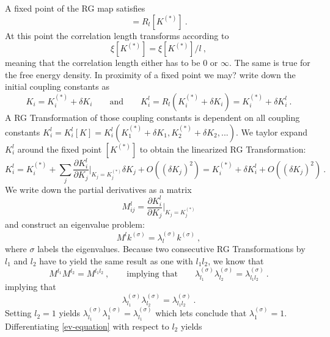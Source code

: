 	A fixed point of the RG	map satisfies
	\begin{equation}
		[K^{(*)}] =	R_l[K^{(*)}] ~.
	\end{equation}
	At this point the correlation length transforms according to
	\begin{equation}
		\xi[K^{(*)}] =	\xi[K^{(*)}] / l~,		
	\end{equation}
	meaning that the correlation length either has to be $0$ or $\infty$. The same is true for the free energy density. In proximity of a fixed point we may? write down the initial coupling constants as
	\begin{equation}
		K_i =	K_i^{(*)} + \delta K_i \qquad \text{and} \qquad K_i^l =	R_l(K_i^{(*)} + \delta K_i) =	K_i^{(*)} + \delta K_i^l~.
	\end{equation}
	A RG Transformation of those coupling constants is dependent on all coupling constants $K^l_i =	K^l_i[K] =	K^l_i(K_1^{(*)} + \delta K_1, K_2^{(*)} + \delta K_2, ...)$. We taylor expand $K_i^l$ around the fixed point $[K^{(*)}]$ to obtain the linearized RG Transformation:
	\begin{equation} \label{linearized-RG}
		K_i^l =	K_i^{(*)} + \sum_j \frac{\partial K_i^l}{\partial K_j} \bigg |_{K_j = K_j^{(*)}} \delta K_j + O((\delta K_j)^2) = K_i^{(*)} + \delta K_i^l + O((\delta K_j)^2) ~.
	\end{equation}
	We write down the partial derivatives as a matrix
	\begin{equation}
		M^l_{ij} =	\frac{\partial K_i^l}{\partial K_j} \bigg |_{K_j = K_j^{(*)}}
	\end{equation}
	and construct an eigenvalue problem:
	\begin{equation} \label{ev-problem}
		M^l k^{(\sigma)} =	\lambda^{(\sigma)}_l k^{(\sigma)}~,
	\end{equation}
	where $\sigma$ labels the eigenvalues. Because two consecutive RG Transformations by $l_1$ and $l_2$ have to yield the same result as one  with $l_1l_2$, we know that 
	\begin{equation}
		M^{l_1}M^{l_2} =	M^{l_1l_2}~, \qquad \text{implying that} \qquad \lambda_{l_1}^{(\sigma)} \lambda_{l_2}^{(\sigma)} =	\lambda_{l_1l_2}^{(\sigma)} ~.
	\end{equation}
	implying that
	\begin{equation}
		\lambda_{l_1}^{(\sigma)} \lambda_{l_2}^{(\sigma)} =	\lambda_{l_1l_2}^{(\sigma)} ~.
		\label{ev-equation}
	\end{equation}
	Setting $l_2 = 1$ yields $\lambda_{l_1}^{(\sigma)} \lambda_{1}^{(\sigma)} =	\lambda_{l_1}^{(\sigma)}$ which lets conclude that $\lambda_{1}^{(\sigma)} =	1$. Differentiating \autoref{ev-equation} with respect to $l_2$ yields
